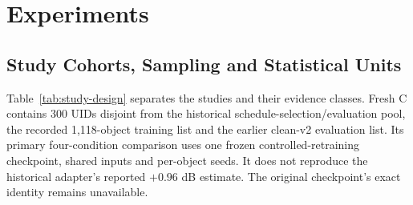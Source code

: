 \documentclass[times,twocolumn,final]{elsarticle}
\providecommand{\DIFadd}[1]{{\protect\color{blue} \sf #1}} %
\providecommand{\DIFaddbegin}{} %
\providecommand{\DIFaddend}{} %
\providecommand{\DIFdelbegin}{} %
\providecommand{\DIFdelend}{} %
\begin{document}
\section{Experiments}
\label{sec:experiments}

\DIFdelbegin %
\DIFdelend \DIFaddbegin \subsection{Study Cohorts, Sampling and Statistical Units}
\DIFaddend \label{subsec:setup}

\DIFdelbegin %
\DIFdelend \DIFaddbegin \DIFadd{Table~\ref{tab:study-design} separates the studies and their evidence classes. Fresh C contains 300 UIDs disjoint from the historical schedule-selection/evaluation pool, the recorded 1,118-object training list and the earlier clean-v2 evaluation list. Its primary four-condition comparison uses one frozen controlled-retraining checkpoint, shared inputs and per-object seeds. It does not reproduce the historical adapter's reported $+0.96$ dB estimate. The original checkpoint's exact identity remains unavailable.
}\DIFaddend 
\end{document}

